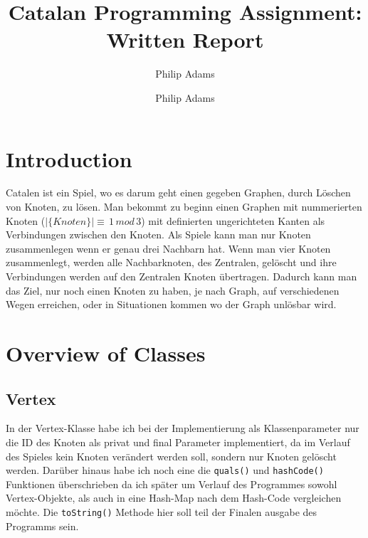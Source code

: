 \documentclass[12pt,a4paper]{article}
\author{Philip Adams}
\title{Catalan Programming Assignment: \\Written Report}
\author{Philip Adams}
\begin{document}
\maketitle

\section{Introduction}
Catalen ist ein Spiel, wo es darum geht einen gegeben Graphen, durch Löschen von Knoten, zu lösen. Man bekommt zu beginn einen Graphen mit nummerierten Knoten ($|\{Knoten\}| \equiv \,1\, mod\, 3$) mit definierten ungerichteten Kanten als Verbindungen zwischen den Knoten. Als Spiele kann man nur Knoten zusammenlegen wenn er genau drei Nachbarn hat. Wenn man vier Knoten zusammenlegt, werden alle Nachbarknoten, des Zentralen, gelöscht und ihre Verbindungen werden auf den Zentralen Knoten übertragen. Dadurch kann man das Ziel, nur noch einen Knoten zu haben, je nach Graph, auf verschiedenen Wegen erreichen, oder in Situationen kommen wo der Graph unlösbar wird.

\section{Overview of Classes}

\subsection{Vertex}
In der Vertex-Klasse habe ich bei der Implementierung als Klassenparameter nur  die ID des Knoten als privat und final Parameter implementiert, da im Verlauf des Spieles kein Knoten verändert werden soll, sondern nur Knoten gelöscht werden. Darüber hinaus habe ich noch eine die \texttt{quals()} und \texttt{hashCode()} Funktionen überschrieben da ich später um Verlauf des Programmes sowohl Vertex-Objekte, als auch in eine Hash-Map nach dem Hash-Code vergleichen möchte. Die \texttt{toString()} Methode hier soll teil der Finalen ausgabe des Programms sein.
\end{document}
